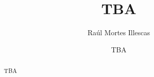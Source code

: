 \documentclass{article}
\title{TBA}
\author{Raúl Mortes Illescas}
\date{TBA}
\begin{document}
\begin{titlingpage}
    \maketitle
    \begin{abstract}
        TBA
    \end{abstract}
\end{titlingpage}

\cleardoublepage

\tableofcontents

\cleardoublepage

\end{document}
